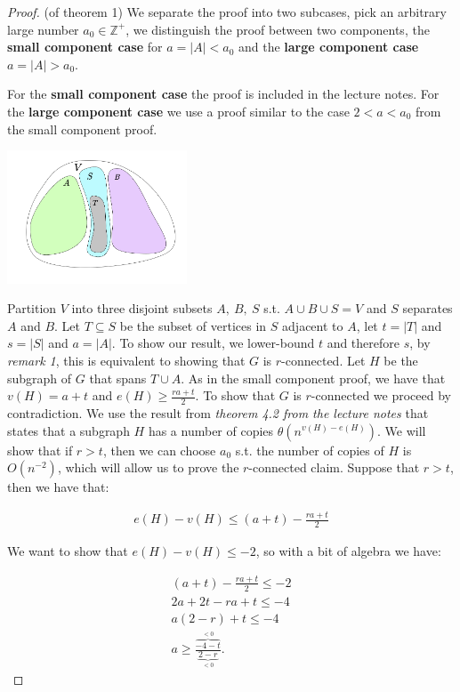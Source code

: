 \documentclass[11pt]{article}
\begin{document}
\begin{proof} (of theorem 1)
    We separate the proof into two subcases, pick an arbitrary large number $a_0 \in \mathbb{Z}^+$, we distinguish the proof between two components, the \textbf{small component case} for $a=|A|<a_0$ and the \textbf{large component case} $a=|A|>a_0$.
    \linebreak

    For the \textbf{small component case} the proof is included in the lecture notes.
    \linebreak
    For the \textbf{large component case} we use a proof similar to the case $2<a<a_0$ from the small component proof.
    \begin{center}
        \includegraphics[width=0.4\textwidth]{figures/1.png}
    \end{center}
    Partition $V$ into three disjoint subsets $A,~B,~S$ s.t. $A\cup B\cup S=V$ and $S$ separates $A$ and $B$. Let $T\subseteq S$ be the subset of vertices in $S$ adjacent to $A$, let $t=|T|$ and $s=|S|$ and $a=|A|$. To show our result, we lower-bound $t$ and therefore $s$, by \textit{remark 1}, this is equivalent to showing that $G$ is $r$-connected. Let $H$ be the subgraph of $G$ that spans $T \cup A$. As in the small component proof, we have that $v(H) = a + t$ and $e(H) \geq \frac{ra + t}{2}$. To show that $G$ is $r$-connected we proceed by contradiction. We use the result from \textit{theorem 4.2 from the lecture notes} that states that a subgraph $H$ has a number of copies $\theta(n^{v(H)-e(H)})$. We will show that if $r>t$, then we can choose $a_0$ s.t. the number of copies of $H$ is $O(n^{-2})$, which will allow us to prove the $r$-connected claim. Suppose that $r>t$, then we have that:

    \begin{align*}
        e(H)-v(H) \leq (a+t) - \frac{ra + t}{2} 
    \end{align*}

    We want to show that $e(H)-v(H) \leq -2$, so with a bit of algebra we have: 

    \begin{align*}
        (a+t) - \frac{ra + t}{2}  \leq -2\\
        2a+2t - ra + t  \leq -4\\
        a(2-r) + t  \leq -4\\
        a  \geq \frac{\overbrace{-4-t}^{<0}}{\underbrace{2-r}_{<0}}.
    \end{align*}


\end{proof}
\end{document}
